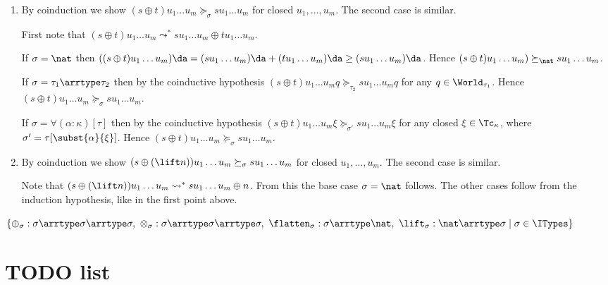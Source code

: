   \begin{enumerate}
  \item By coinduction we show $(s \oplus t) u_1 \ldots u_m
    \succeq_\sigma s u_1 \ldots u_m$ for closed $u_1,\ldots,u_m$. The
    second case is similar.

    First note that $(s \oplus t) u_1 \ldots u_m \leadsto^* s u_1
    \ldots u_m \oplus t u_1 \ldots u_m$.

    If $\sigma = \nat$ then $((s \oplus t) u_1 \ldots u_m)\da = (s u_1
    \ldots u_m)\da + (t u_1 \ldots u_m)\da \ge (s u_1 \ldots
    u_m)\da$. Hence $(s \oplus t) u_1 \ldots u_m) \succeq_\nat s u_1
    \ldots u_m$.

    If $\sigma = \tau_1\arrtype\tau_2$ then by the coinductive
    hypothesis $(s \oplus t) u_1 \ldots u_m q \succeq_{\tau_2} s u_1
    \ldots u_m q$ for any $q \in \World_{\tau_1}$. Hence $(s \oplus t)
    u_1 \ldots u_m \succeq_\sigma s u_1 \ldots u_m$.

    If $\sigma = \forall(\alpha:\kappa)[\tau]$ then by the coinductive
    hypothesis $(s \oplus t) u_1 \ldots u_m \xi \succeq_{\sigma'} s
    u_1 \ldots u_m \xi$ for any closed $\xi \in \Tc_\kappa$, where
    $\sigma' = \tau[\subst{\alpha}{\xi}]$. Hence $(s \oplus t) u_1
    \ldots u_m \succeq_\sigma s u_1 \ldots u_m$.
  \item By coinduction we show $(s \oplus (\lift n)) u_1 \ldots u_m
    \succeq_\sigma s u_1 \ldots u_m$ for closed $u_1,\ldots,u_m$. The
    second case is similar.

    Note that $(s \oplus (\lift n)) u_1 \ldots u_m \leadsto^* s u_1
    \ldots u_m \oplus n$. From this the base case $\sigma=\nat$
    follows. The other cases follow from the induction hypothesis,
    like in the first point above.
  \end{enumerate}


$\{ \oplus_\sigma : \sigma \arrtype
  \sigma \arrtype \sigma,\ \otimes_\sigma : \sigma \arrtype \sigma
  \arrtype \sigma,\ \flatten_{\sigma} : \sigma \arrtype
  \nat,\ \lift_{\sigma} : \nat \arrtype \sigma \mid \sigma \in \ITypes
  \}$

\section{TODO list}

\renewcommand{\theenumii}{\arabic{enumi}.\arabic{enumii}}

